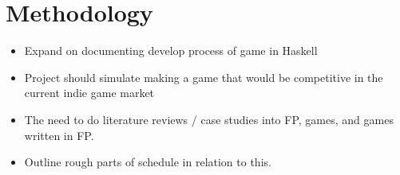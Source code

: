 \section{Methodology}

\begin{itemize}\itemsep-3pt
	\item Expand on documenting develop process of game in Haskell
	\item Project should simulate making a game that would be competitive in the current indie game market
	\item The need to do literature reviews / case studies into FP, games, and games written in FP.
	\item Outline rough parts of schedule in relation to this.
\end{itemize}




